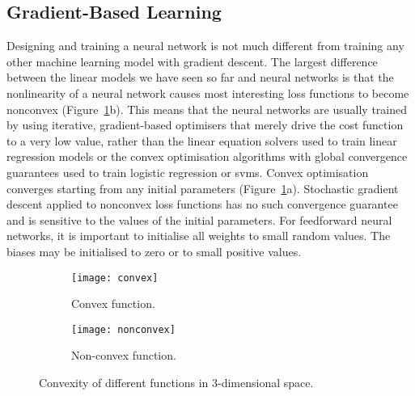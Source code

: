 \subsection{Gradient-Based Learning}
Designing and training a neural network is not much different from training any
other machine learning model with gradient descent. The largest difference
between the linear models we have seen so far and neural networks is that the
nonlinearity of a neural network causes most interesting loss functions to
become nonconvex (Figure~\ref{fig:convexity}b). This means that the neural
networks are usually trained by using iterative, gradient-based optimisers
that merely drive the cost function to a very low value, rather than the linear
equation solvers used to train linear regression models or the convex
optimisation algorithms with global convergence guarantees used to train
logistic regression or \glspl{svm}. Convex optimisation converges starting from
any initial parameters (Figure~\ref{fig:convexity}a). Stochastic gradient
descent applied to nonconvex loss functions has no such convergence guarantee
and is sensitive to the values of the initial parameters. For feedforward
neural networks, it is important to initialise all weights to small random
values. The biases may be initialised to zero or to small positive values.
\begin{figure}[h]
    \centering
    \begin{subfigure}[b]{0.495\linewidth}
        \texttt{[image: convex]}
        \caption{Convex function.}
    \end{subfigure}
    \begin{subfigure}[b]{0.495\linewidth}
        \texttt{[image: nonconvex]}
        \caption{Non-convex function.}
    \end{subfigure}
    \caption{Convexity of different functions in 3-dimensional space.}
    \label{fig:convexity}
\end{figure}

